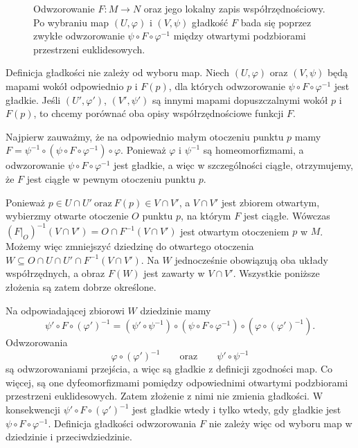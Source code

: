 \begin{figure}[ht]
\caption{Odwzorowanie $F\colon M\to N$ oraz jego lokalny zapis współrzędnościowy. Po wybraniu map $(U,\varphi)$ i $(V,\psi)$ gładkość $F$ bada się poprzez zwykłe odwzorowanie $\psi\circ F\circ\varphi^{-1}$ między otwartymi podzbiorami przestrzeni euklidesowych.}
\label{fig:odwzorowanie-gładkie}
\end{figure}

\begin{uwaga}
Definicja gładkości nie zależy od wyboru map. Niech $(U,\varphi)$ oraz
$(V,\psi)$ będą mapami wokół odpowiednio $p$ i $F(p)$, dla których
odwzorowanie $\psi\circ F\circ\varphi^{-1}$
jest gładkie. Jeśli $(U',\varphi')$, $(V',\psi')$ są innymi mapami
dopuszczalnymi wokół $p$ i $F(p)$, to chcemy porównać oba opisy
współrzędnościowe funkcji $F$.

Najpierw zauważmy, że na odpowiednio małym otoczeniu punktu $p$ mamy
$F = \psi^{-1}\circ (\psi\circ F\circ\varphi^{-1}) \circ\varphi$.
Ponieważ $\varphi$ i $\psi^{-1}$ są homeomorfizmami, a odwzorowanie
$\psi\circ F\circ\varphi^{-1}$ jest gładkie, a więc w szczególności
ciągłe, otrzymujemy, że $F$ jest ciągłe w pewnym otoczeniu punktu $p$.

Ponieważ $p\in U\cap U' \ \text{oraz}\ F(p)\in V\cap V'$,
a $V\cap V'$ jest zbiorem otwartym, wybierzmy otwarte otoczenie
$O$ punktu $p$, na którym $F$ jest ciągłe. Wówczas $(F|_O)^{-1}(V\cap V')=O\cap F^{-1}(V\cap V')$
jest otwartym otoczeniem $p$ w $M$. Możemy więc zmniejszyć dziedzinę
do otwartego otoczenia $W\subseteq O\cap U\cap U'\cap F^{-1}(V\cap V')$.
Na $W$ jednocześnie obowiązują oba układy współrzędnych, a obraz
$F(W)$ jest zawarty w $V\cap V'$. Wszystkie poniższe złożenia są zatem
dobrze określone.

Na odpowiadającej zbiorowi $W$ dziedzinie mamy
\[
\psi'\circ F\circ(\varphi')^{-1}
=
(\psi'\circ\psi^{-1})
\circ
(\psi\circ F\circ\varphi^{-1})
\circ
(\varphi\circ(\varphi')^{-1}).
\]
Odwzorowania
\[
\varphi\circ(\varphi')^{-1}
\qquad\text{oraz}\qquad
\psi'\circ\psi^{-1}
\]
są odwzorowaniami przejścia, a więc są gładkie z definicji zgodności
map. Co więcej, są one dyfeomorfizmami pomiędzy odpowiednimi otwartymi
podzbiorami przestrzeni euklidesowych. Zatem złożenie z nimi nie zmienia
gładkości. W konsekwencji $\psi'\circ F\circ(\varphi')^{-1}$
jest gładkie wtedy i tylko wtedy, gdy gładkie jest $\psi\circ F\circ\varphi^{-1}$.
Definicja gładkości odwzorowania $F$ nie zależy więc od wyboru map
w dziedzinie i przeciwdziedzinie.
\end{uwaga}

